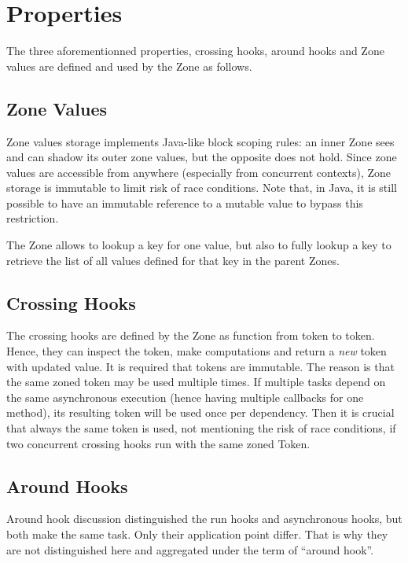 \section{Properties} %

The three aforementionned properties, crossing hooks, around hooks and Zone values are defined and used by the Zone as follows.

\subsection*{Zone Values}
Zone values storage implements Java-like block scoping rules: an inner Zone sees and can shadow its outer zone values, but the opposite does not hold. Since zone values are accessible from anywhere (especially from concurrent contexts), Zone storage is immutable to limit risk of race conditions. Note that, in Java, it is still possible to have an immutable reference to a mutable value to bypass this restriction.

The Zone allows to lookup a key for one value, but also to fully lookup a key to retrieve the list of all values defined for that key in the parent Zones.

\subsection*{Crossing Hooks}

The crossing hooks are defined by the Zone as function from token to token. Hence, they can inspect the token, make computations and return a \emph{new} token with updated value. It is required that tokens are immutable. The reason is that the same zoned token may be used multiple times. If multiple tasks depend on the same asynchronous execution (hence having multiple callbacks for one method), its resulting token will be used once per dependency. Then it is crucial that always the same token is used, not mentioning the risk of race conditions, if two concurrent crossing hooks run with the same zoned Token.

\subsection*{Around Hooks}

Around hook discussion distinguished the run hooks and asynchronous hooks, but both make the same task. Only their application point differ. That is why they are not distinguished here and aggregated under the term of ``around hook''.

